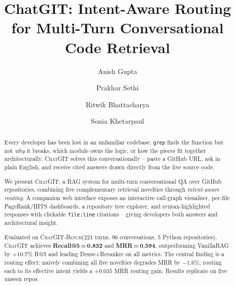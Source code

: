 \documentclass[runningheads]{llncs}
\newcommand{\chatgit}{\textsc{ChatGIT}\xspace}
\newcommand{\conv}{\textsc{ChatGIT-Bench}\xspace}
\begin{document}
\title{ChatGIT: Intent-Aware Routing for Multi-Turn
Conversational Code Retrieval}


\author{Anish Gupta \and
        Prakhar Sethi \and
        Ritwik Bhattacharya \and
        Sonia Khetarpaul}



\maketitle

\begin{abstract}
Every developer has been lost in an unfamiliar codebase: \texttt{grep} finds
the function but not \emph{why} it breaks, which module owns the logic, or
how the pieces fit together architecturally. \chatgit solves this
conversationally -- paste a GitHub URL, ask in plain English, and receive
cited answers drawn directly from the live source code.

We present \chatgit, a RAG system for multi-turn conversational QA over
GitHub repositories, combining five complementary retrieval novelties through
\emph{intent-aware routing}. A companion web interface exposes an interactive
call-graph visualiser, per-file PageRank/HITS dashboards, a repository tree
explorer, and syntax-highlighted responses with clickable \texttt{file:line}
citations -- giving developers both answers and architectural insight.

Evaluated on \conv (221 turns, 96 conversations, 5 Python repositories),
\chatgit achieves \textbf{Recall@5\,=\,0.832} and \textbf{MRR\,=\,0.594},
outperforming VanillaRAG by $+10.7\%$ R@5 and leading Dense+Reranker on all
metrics. The central finding is a routing effect: naively combining all five
novelties degrades MRR by $-1.6\%$; routing each to its effective intent
yields a $+0.035$ MRR routing gain. Results replicate on five unseen repos.

\end{abstract}
\end{document}
